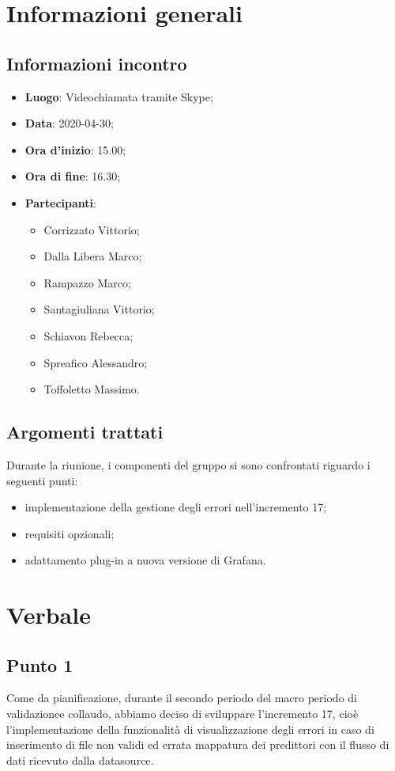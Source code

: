 \section{Informazioni generali}
    \subsection{Informazioni incontro}
        \begin{itemize}
            \item \textbf{Luogo}: Videochiamata tramite Skype;
            \item \textbf{Data}: 2020-04-30;
            \item \textbf{Ora d'inizio}: 15.00;
            \item \textbf{Ora di fine}: 16.30;
            \item \textbf{Partecipanti}: 
            \begin{itemize}
                \item Corrizzato Vittorio;
                \item Dalla Libera Marco;
                \item Rampazzo Marco;
                \item Santagiuliana Vittorio;
                \item Schiavon Rebecca;
                \item Spreafico Alessandro;
                \item Toffoletto Massimo.
            \end{itemize}
        \end{itemize}
    \subsection{Argomenti trattati}
        Durante la riunione, i componenti del gruppo si sono confrontati riguardo i seguenti punti:
		\begin{itemize}
			\item implementazione della gestione degli errori nell'incremento 17;
			\item requisiti opzionali;
			\item adattamento plug-in a nuova versione di Grafana\glo.
		\end{itemize}
\section{Verbale}
    \subsection{Punto 1} 
    Come da pianificazione, durante il secondo periodo del macro periodo di validazione\glosp e collaudo, abbiamo deciso di sviluppare l'incremento 17, cioè l'implementazione della funzionalità di visualizzazione degli errori in caso di inserimento di file non validi ed errata mappatura dei predittori con il flusso di dati ricevuto dalla datasource.
